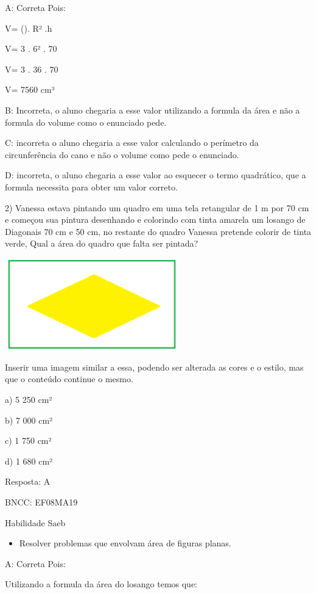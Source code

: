 A: Correta Pois:

V= (\Pi). R² .h

V= 3 . 6² . 70

V= 3 . 36 . 70

V= 7560 cm³

B: Incorreta, o aluno chegaria a esse valor utilizando a formula da área
e não a formula do volume como o enunciado pede.

C: incorreta o aluno chegaria a esse valor calculando o perímetro da
circunferência do cano e não o volume como pede o enunciado.

D: incorreta, o aluno chegaria a esse valor ao esquecer o termo
quadrático, que a formula necessita para obter um valor correto.

2) Vanessa estava pintando um quadro em uma tela retangular de 1 m por
70 cm e começou sua pintura desenhando e colorindo com tinta amarela um
losango de Diagonais 70 cm e 50 cm, no restante do quadro Vanessa
pretende colorir de tinta verde, Qual a área do quadro que falta ser
pintada?

\includegraphics[width=2.95833in,height=1.56526in]{./imgSAEB_8_MAT/media/image54.png}

Inserir uma imagem similar a essa, podendo ser alterada as cores e o
estilo, mas que o conteúdo continue o mesmo.

a) 5 250 cm²

b) 7 000 cm²

c) 1 750 cm²

d) 1 680 cm²

Resposta: A

BNCC: EF08MA19

Habilidade Saeb

\begin{itemize}
\tightlist
\item
  Resolver problemas que envolvam área de figuras planas.
\end{itemize}

A: Correta Pois:

Utilizando a formula da área do losango temos que:

